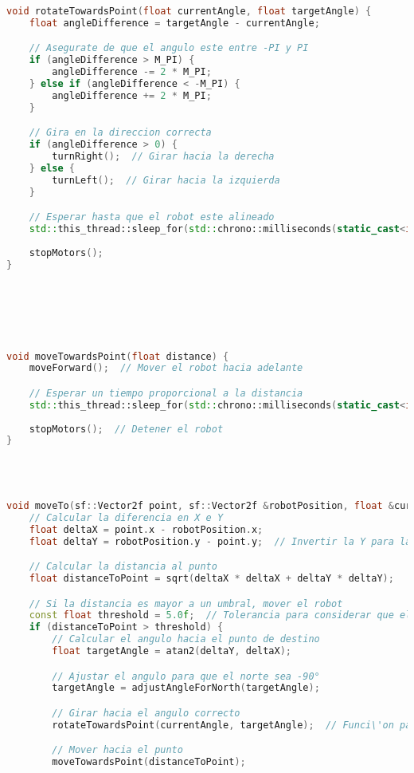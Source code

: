 \begin{lstlisting}[language={C++}, caption={Cuarto ajuste de c\'odigo}, label={CuartoAjuste}]
void rotateTowardsPoint(float currentAngle, float targetAngle) {
    float angleDifference = targetAngle - currentAngle;

    // Asegurate de que el angulo este entre -PI y PI
    if (angleDifference > M_PI) {
        angleDifference -= 2 * M_PI;
    } else if (angleDifference < -M_PI) {
        angleDifference += 2 * M_PI;
    }

    // Gira en la direccion correcta
    if (angleDifference > 0) {
        turnRight();  // Girar hacia la derecha
    } else {
        turnLeft();  // Girar hacia la izquierda
    }

    // Esperar hasta que el robot este alineado
    std::this_thread::sleep_for(std::chrono::milliseconds(static_cast<int>(std::fabs(angleDifference) * 1000)));
    
    stopMotors();
}






void moveTowardsPoint(float distance) {
    moveForward();  // Mover el robot hacia adelante

    // Esperar un tiempo proporcional a la distancia
    std::this_thread::sleep_for(std::chrono::milliseconds(static_cast<int>(distance * 1000)));
    
    stopMotors();  // Detener el robot
}




void moveTo(sf::Vector2f point, sf::Vector2f &robotPosition, float &currentAngle) {
    // Calcular la diferencia en X e Y
    float deltaX = point.x - robotPosition.x;
    float deltaY = robotPosition.y - point.y;  // Invertir la Y para la pantalla

    // Calcular la distancia al punto
    float distanceToPoint = sqrt(deltaX * deltaX + deltaY * deltaY);

    // Si la distancia es mayor a un umbral, mover el robot
    const float threshold = 5.0f;  // Tolerancia para considerar que el punto ha sido alcanzado
    if (distanceToPoint > threshold) {
        // Calcular el angulo hacia el punto de destino
        float targetAngle = atan2(deltaY, deltaX);

        // Ajustar el angulo para que el norte sea -90°
        targetAngle = adjustAngleForNorth(targetAngle);

        // Girar hacia el angulo correcto
        rotateTowardsPoint(currentAngle, targetAngle);  // Funci\'on para girar hacia el \'angulo

        // Mover hacia el punto
        moveTowardsPoint(distanceToPoint);
        

\end{lstlisting}
